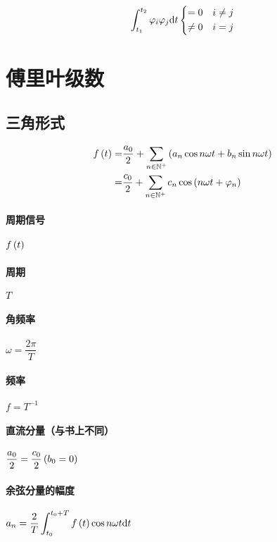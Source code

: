 \documentclass{article}
\begin{document}
\[\int_{t_1}^{t_2}\varphi_i\varphi_j\mathrm d t
    \left\{\begin{aligned}
        =0    &  & i\neq j \\
        \neq0 &  & i=j
    \end{aligned}\right.\]

\section{傅里叶级数}

\subsection{三角形式}

\[\begin{aligned}
        f\left(t\right)
        = & \frac{a_0}2+\sum_{n\in\mathbb N^+}\left(a_n\cos n\omega t+b_n\sin n\omega t\right) \\
        = & \frac{c_0}2+\sum_{n\in\mathbb N^+}c_n\cos\left(n\omega t+\varphi_n\right)
    \end{aligned}\]

\paragraph{周期信号}$f\left(t\right)$

\paragraph{周期}$T$

\paragraph{角频率}$\omega=\dfrac{2\pi}T$

\paragraph{频率}$f=T^{-1}$

\paragraph{直流分量（与书上不同）}$\dfrac{a_0}2=\dfrac{c_0}2\left(b_0=0\right)$

\paragraph{余弦分量的幅度}$\displaystyle a_n=\frac2T\int_{t_0}^{t_0+T}f\left(t\right)\cos n\omega t\mathrm d t$
\end{document}
